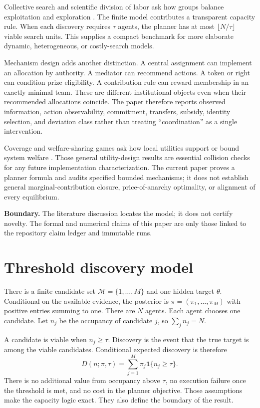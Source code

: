 \documentclass[11pt]{article}
\newcommand{\Boundary}[1]{\par\noindent\textbf{Boundary.} #1\par}
\begin{document}
Collective search and scientific division of labor ask how groups balance
exploitation and exploration \citep{March1991,Kitcher1990,Zollman2007}. The
finite model contributes a transparent capacity rule. When each discovery
requires $\tau$ agents, the planner has at most $\lfloor N/\tau\rfloor$ viable
search units. This supplies a compact benchmark for more elaborate dynamic,
heterogeneous, or costly-search models.

Mechanism design adds another distinction. A central assignment can implement
an allocation by authority. A mediator can recommend actions. A token or right
can condition prize eligibility. A contribution rule can reward membership in
an exactly minimal team. These are different institutional objects even when
their recommended allocations coincide. The paper therefore reports observed
information, action observability, commitment, transfers, subsidy, identity
selection, and deviation class rather than treating ``coordination'' as a
single intervention.

Coverage and welfare-sharing games ask how local utilities support or bound
system welfare \citep{Vetta2002,MardenWierman2013,PaccagnanChandanMarden2020}.
Those general utility-design results are essential collision checks for any
future implementation characterization. The current paper proves a planner
formula and audits specified bounded mechanisms; it does not establish general
marginal-contribution closure, price-of-anarchy optimality, or alignment of
every equilibrium.

\Boundary{The literature discussion locates the model; it does not certify
novelty. The formal and numerical claims of this paper are only those linked to
the repository claim ledger and immutable runs.}

\section{Threshold discovery model}

There is a finite candidate set $\mathcal M=\{1,\ldots,M\}$ and one hidden
target $\theta$. Conditional on the available evidence, the posterior is
$\pi=(\pi_1,\ldots,\pi_M)$ with positive entries summing to one. There are $N$
agents. Each agent chooses one candidate. Let $n_j$ be the occupancy of
candidate $j$, so $\sum_j n_j=N$.

A candidate is viable when $n_j\geq\tau$. Discovery is the event that the true
target is among the viable candidates. Conditional expected discovery is
therefore
\begin{equation}
 D(n;\pi,\tau)=\sum_{j=1}^{M}\pi_j\mathbf 1\{n_j\geq\tau\}.
 \label{eq:discovery}
\end{equation}
There is no additional value from occupancy above $\tau$, no execution failure
once the threshold is met, and no cost in the planner objective. Those
assumptions make the capacity logic exact. They also define the boundary of
the result.
\end{document}
